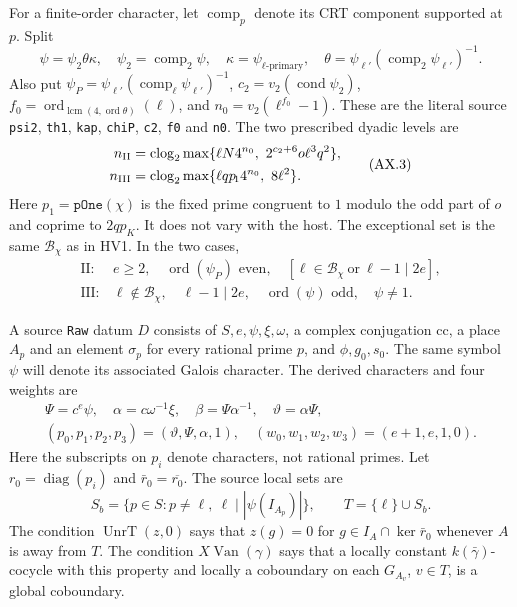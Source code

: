 For a finite-order character, let $\operatorname{comp}_p$ denote its
CRT component supported at $p$.  Split
\[
 \psi=\psi_2\theta\kappa,
 \quad \psi_2=\operatorname{comp}_2\psi,
 \quad \kappa=\psi_{\ell\text{-primary}},
 \quad \theta=\psi_{\ell'}(\operatorname{comp}_2\psi_{\ell'})^{-1}.
 \tag{AX.2}
\]
Also put $\psi_P=\psi_{\ell'}
(\operatorname{comp}_\ell\psi_{\ell'})^{-1}$,
$c_2=v_2(\operatorname{cond}\psi_2)$,
$f_0=\operatorname{ord}_{\operatorname{lcm}(4,\operatorname{ord}\theta)}(\ell)$,
and $n_0=v_2(\ell^{f_0}-1)$.  These are the literal source
\texttt{psi2}, \texttt{th1}, \texttt{kap}, \texttt{chiP},
\texttt{c2}, \texttt{f0} and \texttt{n0}.
The two prescribed dyadic levels are
\[
\begin{split}
 n_{\rm II}&=\operatorname{clog}_2\max
  \{\ell N4^{n_0},\ 2^{c_2+6}o\ell^3q^2\},\\
 n_{\rm III}&=\operatorname{clog}_2\max
  \{\ell q p_{\!1}4^{n_0},\ 8\ell^2\}.
\end{split}\tag{AX.3}
\]
Here $p_{\!1}=\mathtt{pOne}(\chi)$ is the fixed prime congruent to
$1$ modulo the odd part of $o$ and coprime to $2qp_K$.  It does not
vary with the host.  The exceptional set is the same
$\mathcal B_\chi$ as in HV1.  In the two cases,
\[
\begin{array}{ll}
\mathrm{II}:&e\ge2,\quad \operatorname{ord}(\psi_P)\text{ even},
 \quad[\ell\in\mathcal B_\chi\ \text{or}\ \ell-1\mid2e],\\
\mathrm{III}:&\ell\notin\mathcal B_\chi,\quad\ell-1\mid2e,
 \quad\operatorname{ord}(\psi)\text{ odd},\quad\psi\ne1.
\end{array}\tag{AX.4}
\]

A source \texttt{Raw} datum $D$ consists of $S,e,\psi,\xi,\omega$,
a complex conjugation $\mathrm{cc}$, a place $A_p$ and an element
$\sigma_p$ for every rational prime $p$, and $\phi,g_0,s_0$.
The same symbol $\psi$ will denote its associated Galois character.
The derived characters and four weights are
\[
 \begin{gathered}
 \Psi=c^e\psi,\quad \alpha=c\omega^{-1}\xi,
 \quad\beta=\Psi\alpha^{-1},\quad\vartheta=\alpha\Psi,\\
 (p_0,p_1,p_2,p_3)=(\vartheta,\Psi,\alpha,1),
 \quad(w_0,w_1,w_2,w_3)=(e+1,e,1,0).
 \end{gathered}
 \tag{AX.5}
\]
Here the subscripts on $p_i$ denote characters, not rational primes.
Let $r_0=\operatorname{diag}(p_i)$ and $\bar r_0=\overline{r_0}$.
The source local sets are
\[
 S_b=\{p\in S:p\ne\ell,
       \ \ell\mid|\psi(I_{A_p})|\},\qquad T=\{\ell\}\cup S_b.
 \tag{AX.6}
\]
The condition $\operatorname{UnrT}(z,0)$ says that $z(g)=0$ for
$g\in I_A\cap\ker\bar r_0$ whenever $A$ is away from $T$.
The condition $X\!\operatorname{Van}(\gamma)$ says that a locally
constant $k(\bar\gamma)$-cocycle with this property and locally a
coboundary on each $G_{A_v}$, $v\in T$, is a global coboundary.


